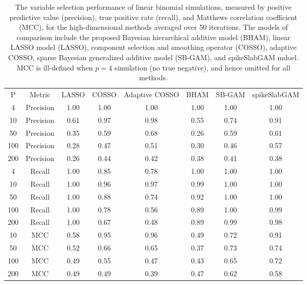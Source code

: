 \begin{table}[ht]
\centering
\begin{tabular}{cccccccc}
 P & Metric & LASSO & COSSO & Adaptive COSSO & BHAM & SB-GAM & spikeSlabGAM \\ 
   4 & Precision & 1.00 & 1.00 & 1.00 & 1.00 & 1.00 & 1.00 \\ 
   10 & Precision & 0.61 & 0.97 & 0.98 & 0.55 & 0.74 & 0.91 \\ 
   50 & Precision & 0.35 & 0.59 & 0.68 & 0.26 & 0.59 & 0.61 \\ 
  100 & Precision & 0.28 & 0.47 & 0.51 & 0.30 & 0.46 & 0.57 \\ 
  200 & Precision & 0.26 & 0.44 & 0.42 & 0.38 & 0.41 & 0.38 \\ 
   \hline
  4 & Recall & 1.00 & 0.85 & 0.78 & 1.00 & 1.00 & 1.00 \\ 
   10 & Recall & 1.00 & 0.96 & 0.97 & 0.99 & 1.00 & 1.00 \\ 
   50 & Recall & 1.00 & 0.88 & 0.74 & 0.92 & 1.00 & 1.00 \\ 
  100 & Recall & 1.00 & 0.78 & 0.56 & 0.89 & 1.00 & 0.99 \\ 
  200 & Recall & 1.00 & 0.67 & 0.48 & 0.89 & 0.99 & 0.98 \\ 
   \hline
 10 & MCC & 0.58 & 0.95 & 0.96 & 0.49 & 0.72 & 0.91 \\ 
   50 & MCC & 0.52 & 0.66 & 0.65 & 0.37 & 0.73 & 0.74 \\ 
  100 & MCC & 0.49 & 0.55 & 0.47 & 0.43 & 0.65 & 0.72 \\ 
  200 & MCC & 0.49 & 0.49 & 0.39 & 0.47 & 0.62 & 0.58 \\ 
  \end{tabular}
\caption{The variable selection performance of linear binomial simulations,
                         measured by positive predictive value (precision), true positive rate (recall),
                         and Matthews correlation coefficient (MCC), for the high-dimensional methods
                         averaged over 50 iterations. The models of comparison include the proposed Bayesian
                         hierarchical additive model (BHAM), linear LASSO model (LASSO), component selection
                         and smoothing operator (COSSO), adaptive COSSO, sparse Bayesian generalized
                         additive model (SB-GAM), and spikeSlabGAM mdoel. MCC is ill-defined when $p=4$
                         simulation (no true negative), and hence omitted for all methods.} 
\label{tab:sim_lnr_binom_var_select}
\end{table}
